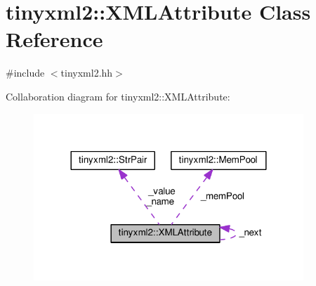 \hypertarget{classtinyxml2_1_1XMLAttribute}{}\section{tinyxml2\+:\+:X\+M\+L\+Attribute Class Reference}
\label{classtinyxml2_1_1XMLAttribute}


{\ttfamily \#include $<$tinyxml2.\+hh$>$}



Collaboration diagram for tinyxml2\+:\+:X\+M\+L\+Attribute\+:
\nopagebreak
\begin{figure}[H]
\begin{center}
\leavevmode
\includegraphics[width=288pt]{classtinyxml2_1_1XMLAttribute__coll__graph}
\end{center}
\end{figure}
